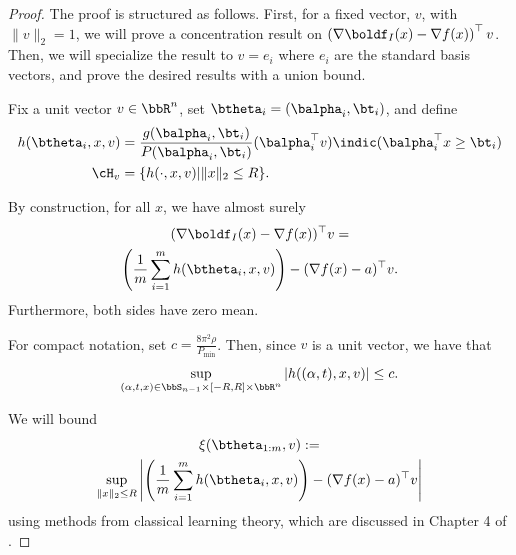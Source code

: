 \documentclass[letterpaper, 10 pt, conference]{ieeeconf}  %
\begin{document}
\begin{proof}
  The proof is structured as follows. First, for a fixed vector, $v$, with $\|v\|_2=1$, we will prove a concentration result on $\left(\nabla \boldf_I(x)-\nabla f(x)\right)^\top v$. Then, we will specialize the result to $v=e_i$ where $e_i$ are the standard basis vectors, and prove the desired results with a union bound.
  
  Fix a unit vector $v\in\bbR^n$, set $\btheta_i=(\balpha_i,\bt_i)$, and define
  \begin{align*}
    h(\btheta_i,x,v)&=\frac{g(\balpha_i,\bt_i)}{P(\balpha_i,\bt_i)}(\balpha_i^\top v)\indic(\balpha_i^\top x\ge\bt_i) \\
    \cH_v &= \{h(\cdot,x,v)|\|x\|_2\le R\}.
  \end{align*}


  
  By construction, for all $x$, we have almost surely
  \begin{multline*}
    (\nabla \boldf_I(x)-\nabla f(x))^\top v=\\
    \left(\frac{1}{m}\sum_{i=1}^m h(\btheta_i,x,v)\right)-(\nabla f(x)-a)^\top v.
  \end{multline*}
  Furthermore, both sides have zero mean.

    For compact notation, set $c=\frac{8\pi^2\rho}{P_{\min}}$. Then, since $v$ is a unit vector, we have that
  $$
  \sup_{(\alpha,t,x)\in\bbS_{n-1}\times [-R,R]\times \bbR^n}|h((\alpha,t),x,v)|\le c.
  $$

  We will bound
  \begin{multline*}
    \xi(\btheta_{1:m},v):=\\
    \sup_{\|x\|_2\le R}\left| \left(\frac{1}{m}\sum_{i=1}^m h(\btheta_i,x,v)\right)-(\nabla f(x)-a)^\top v\right|
  \end{multline*}
  using methods from classical learning theory, which are discussed in Chapter 4 of \cite{wainwright2019high}. 


\end{proof}
\end{document}
